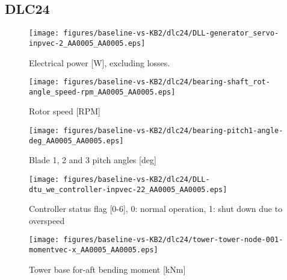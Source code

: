 
\subsection{DLC24}
\label{sec:baseline-vs-KB2:dlc24}

\begin{figure}[!ht]
\begin{center}
	\texttt{[image: figures/baseline-vs-KB2/dlc24/DLL-generator\_servo-inpvec-2\_AA0005\_AA0005.eps]}
\end{center}
\caption{Electrical power [W], excluding losses.}
\label{fig:baseline-vs-KB2:dlc24:power}
\end{figure}

\begin{figure}[!ht]
\begin{center}
	\texttt{[image: figures/baseline-vs-KB2/dlc24/bearing-shaft\_rot-angle\_speed-rpm\_AA0005\_AA0005.eps]}
\end{center}
\caption{Rotor speed [RPM]}
\label{fig:baseline-vs-KB2:dlc24:rpm}
\end{figure}

\begin{figure}[!ht]
\begin{center}
	\texttt{[image: figures/baseline-vs-KB2/dlc24/bearing-pitch1-angle-deg\_AA0005\_AA0005.eps]}
\end{center}
\caption{Blade 1, 2 and 3 pitch angles [deg]}
\label{fig:baseline-vs-KB2:dlc24:pitch}
\end{figure}

\begin{figure}[!ht]
\begin{center}
	\texttt{[image: figures/baseline-vs-KB2/dlc24/DLL-dtu\_we\_controller-inpvec-22\_AA0005\_AA0005.eps]}
\end{center}
\caption{Controller status flag [0-6], 0: normal operation, 1: shut down due to overspeed}
\label{fig:baseline-vs-KB2:dlc24:status}
\end{figure}

\begin{figure}[!ht]
\begin{center}
	\texttt{[image: figures/baseline-vs-KB2/dlc24/tower-tower-node-001-momentvec-x\_AA0005\_AA0005.eps]}
\end{center}
\caption{Tower base for-aft bending moment [kNm]}
\label{fig:baseline-vs-KB2:dlc24:tower-base-fa}
\end{figure}

